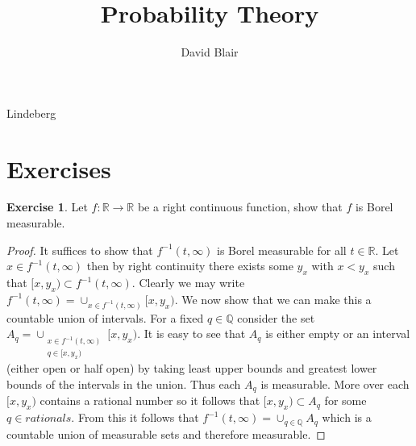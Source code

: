\documentclass{amsbook}
\theoremstyle{definition}
\newtheorem{xca}{Exercise}
\theoremstyle{remark}
\newcommand{\reals}{\mathbb{R}}
\newcommand{\rationals}{\mathbb{Q}}
\begin{document}
\frontmatter
\title{Probability Theory}
\author{David Blair}
\maketitle

\mainmatter

\tableofcontents











 {Lindeberg}





























\section{Exercises}
\begin{xca}Let $f : \reals \to \reals$ be a right continuous function,
  show that $f$ is Borel measurable.
\end{xca}
\begin{proof}
It suffices to show that $f^{-1}(t, \infty)$ is Borel measurable for
all $t \in \reals$.  Let $x \in f^{-1}(t, \infty)$ then by right
continuity there exists some $y_x$ with $x < y_x$ such that $[x,y_x) \subset
f^{-1}(t, \infty)$.  Clearly we may write $f^{-1}(t, \infty) = \cup_{x
  \in f^{-1}(t, \infty)} [x, y_x)$.  We now show that we can make this
a countable union of intervals.  For a fixed $q \in \rationals$
consider the set $A_q = \cup_{\substack{x \in f^{-1}(t, \infty) \\ q
    \in [x, y_x)}} [x, y_x)$.  It is easy to see that $A_q$ is either
empty or an
interval (either open or half open) by taking least upper bounds and
greatest lower bounds of the intervals in the union.  Thus each $A_q$
is measurable.  More over each $[x,y_x)$ contains a rational number so
it follows that $[x,y_x) \subset A_q$ for some $q \in rationals$.
From this it follows that $f^{-1}(t, \infty) = \cup_{q \in
  \rationals}A_q$ which is a countable union of measurable sets and
therefore measurable.
\end{proof}
\end{document}
